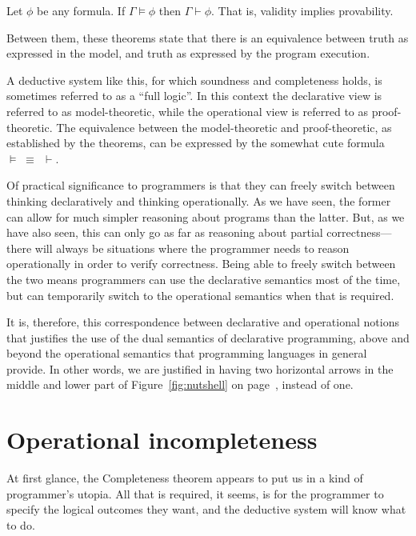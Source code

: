 \begin{theorem}[Completeness] \label{thm:completeness}
Let $\phi$ be any formula.
If\: $\Gamma \models \phi$ then $\Gamma \vdash \phi$.
That is, validity implies provability.
\end{theorem}

\noindent
Between them,
these theorems state that there is an equivalence between
truth as expressed in the model,
and truth as expressed by the program execution.

A deductive system like this,
for which soundness and completeness holds,
is sometimes referred to as a ``full logic\label{gi:full-logic}''.
In this context the declarative view
is referred to as model-theoretic,
while the operational view
is referred to as proof-theoretic.
The equivalence between the model-theoretic and proof-theoretic,
as established by the theorems,
can be expressed by the somewhat cute formula
$\models\; \equiv\;\, \vdash$.

Of practical significance to programmers
is that they can freely switch between
thinking declaratively and thinking operationally.
As we have seen, the former can allow for
much simpler reasoning about programs than the latter.
But, as we have also seen,
this can only go as far as reasoning about partial correctness---%
there will always be situations where
the programmer needs to reason operationally in order to verify correctness.
Being able to freely switch between the two means programmers
can use the declarative semantics most of the time,
but can temporarily switch to the operational semantics when that is required.

It is, therefore,
this correspondence between declarative and operational notions
that justifies the use of the dual semantics of declarative programming,
above and beyond the operational semantics
that programming languages in general provide.
In other words,
we are justified in having two horizontal arrows
in the middle and lower part of Figure~\ref{fig:nutshell}
on page~\pageref{fig:nutshell},
instead of one.

\label{end:op-sem}


\section{Operational incompleteness}
\label{sec:incompleteness}

At first glance,
the Completeness theorem appears to put us in
a kind of programmer's utopia.
All that is required, it seems,
is for the programmer to specify the logical outcomes they want,
and the deductive system will know what to do.

